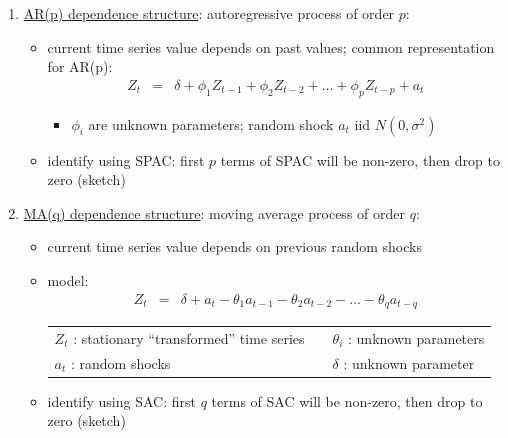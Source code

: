 \documentclass[12pt]{notes}
\begin{document}
\begin{enumerate}[leftmargin=*]
\begin{itemize}
\begin{enumerate}
\item \underline{AR(p) dependence structure}: autoregressive process of order $p$:
\begin{itemize}
\item current time series value depends on past values; common representation for AR(p):
\begin{eqnarray}
Z_t & = & \delta + \phi_1 Z_{t-1} + \phi_2 Z_{t-2} + \ldots + \phi_p Z_{t-p} + a_t \nonumber
\end{eqnarray}
    \begin{itemize}
      \item $\phi_i$ are unknown parameters; random shock $a_t$ iid $N(0,\sigma^2)$
    \end{itemize}
\item identify using SPAC:
  first $p$ terms of SPAC will be non-zero, then drop to zero (sketch)\\ \vspace{3em}
\end{itemize}


\item \underline{MA(q) dependence structure}: moving average process of order $q$:
 \begin{itemize}
    \item current time series value depends on previous random shocks
    \item model:\\ \vspace{-2em}
\begin{eqnarray}
  Z_t & = & \delta + a_t - \theta_1 a_{t-1} - \theta_2 a_{t-2} - \ldots - \theta_q a_{t-q} \nonumber
\end{eqnarray}
\begin{tabular}{l l l}
   $Z_t$ : stationary ``transformed'' time series  & &  $\theta_i$ : unknown parameters\\
   $a_t$ : random shocks  & & $\delta$ : unknown parameter
\end{tabular}

  \vspace{1em}

   \item identify using SAC:
  first $q$ terms of SAC will be non-zero, then drop to zero (sketch)\\ \vspace{4em}
\end{itemize}

\end{enumerate}


\end{itemize}
\end{enumerate}
\end{document}

